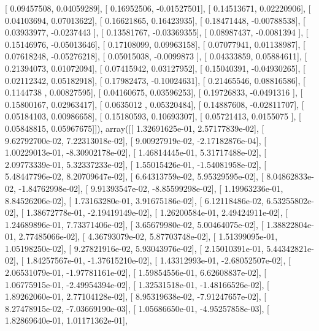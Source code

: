 \documentclass{article}
\begin{document}
       [ 0.09457508,  0.04059289],
       [ 0.16952506, -0.01527501],
       [ 0.14513671,  0.02220906],
       [ 0.04103694,  0.07013622],
       [ 0.16621865,  0.16423935],
       [ 0.18471448, -0.00788538],
       [ 0.03933977, -0.0237443 ],
       [ 0.13581767, -0.03369355],
       [ 0.08987437, -0.0081394 ],
       [ 0.15146976, -0.05013646],
       [ 0.17108099,  0.09963158],
       [ 0.07077941,  0.01138987],
       [ 0.07618248, -0.05276218],
       [ 0.05015038, -0.0099873 ],
       [ 0.04333859,  0.05884611],
       [ 0.21394073,  0.01072094],
       [ 0.07415942,  0.03127952],
       [ 0.15040391, -0.04930265],
       [ 0.02112342,  0.05182918],
       [ 0.17982473, -0.10024631],
       [ 0.21465546,  0.08816586],
       [ 0.1144738 ,  0.00827595],
       [ 0.04160675,  0.03596253],
       [ 0.19726833, -0.0491316 ],
       [ 0.15800167,  0.02963417],
       [ 0.0635012 ,  0.05320484],
       [ 0.14887608, -0.02811707],
       [ 0.05184103,  0.00986658],
       [ 0.15180593,  0.10693307],
       [ 0.05721413,  0.0155075 ],
       [ 0.05848815,  0.05967675]]), array([[  1.32691625e-01,   2.57177839e-02],
       [  9.62792700e-02,   7.22313018e-02],
       [  9.00927919e-02,  -2.17182876e-04],
       [  1.00229013e-01,  -8.30902178e-02],
       [  1.46814445e-01,   5.31717488e-02],
       [  2.09773339e-01,   5.32337233e-02],
       [  1.55015426e-01,  -1.54081958e-02],
       [  5.48447796e-02,   8.20709647e-02],
       [  6.64313759e-02,   5.95329595e-02],
       [  8.04862833e-02,  -1.84762998e-02],
       [  9.91393547e-02,  -8.85599298e-02],
       [  1.19963236e-01,   8.84526206e-02],
       [  1.73163280e-01,   3.91675186e-02],
       [  6.12118486e-02,   6.53255802e-02],
       [  1.38672778e-01,  -2.19419149e-02],
       [  1.26200584e-01,   2.49424911e-02],
       [  1.24689896e-01,   7.73371406e-02],
       [  3.65679980e-02,   5.00464075e-02],
       [  1.38822804e-01,   2.77485066e-02],
       [  4.36793079e-02,   5.87703748e-02],
       [  1.51399095e-01,   1.05198250e-02],
       [  9.27821916e-02,   5.93043976e-02],
       [  2.15010391e-01,   5.44342821e-02],
       [  1.84257567e-01,  -1.37615210e-02],
       [  1.43312993e-01,  -2.68052507e-02],
       [  2.06531079e-01,  -1.97781161e-02],
       [  1.59854556e-01,   6.62608837e-02],
       [  1.06775915e-01,  -2.49954394e-02],
       [  1.32531518e-01,  -1.48166526e-02],
       [  1.89262060e-01,   2.77104128e-02],
       [  8.95319638e-02,  -7.91247657e-02],
       [  8.27478915e-02,  -7.03669190e-03],
       [  1.05686650e-01,  -4.95257858e-03],
       [  1.82869640e-01,   1.01171362e-01],
\end{document}
